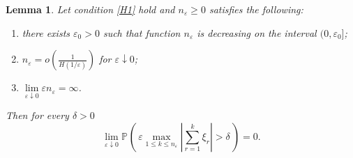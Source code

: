 \documentclass{article}
\makeatletter
\theoremstyle{plain}
\newtheorem{lemma}[theorem]{Lemma}
\theoremstyle{definition}
\theoremstyle{remark}
\newcommand{\p}[2][]{{\mathbb{P}}_{#1} \left( \, #2 \, \right) } %
\def\namedlabel#1#2{\begingroup
    #2%
    \def\@currentlabel{#2}%
    \phantomsection\label{#1}\endgroup
}
\makeatother
\begin{document}
\begin{lemma} \label{l.03} Let condition \ref{H1} hold and 
$n_\varepsilon \geqslant 0$ satisfies the following:
\begin{enumerate}
    \item[\namedlabel{i_l.03}{$(i)$}] there exists $\varepsilon_0>0$ such that function $n_\varepsilon$ is decreasing on the interval $(0,\varepsilon_0]$;
    \item[\namedlabel{ii_l.03}{$(ii)$}] $n_\varepsilon=o\left(\frac{1}{H(1/\varepsilon)}\right)$ for $\varepsilon\downarrow 0$;
    \item[\namedlabel{iii_l.03}{$(iii)$}] $\lim\limits_{\varepsilon\downarrow 0}\varepsilon n_\varepsilon=\infty$.
\end{enumerate}

Then for every $\delta>0$
$$
\lim\limits_{\varepsilon\downarrow 0}\p{\varepsilon\max\limits_{1\leqslant k \leqslant n_\varepsilon}\left|\sum\limits_{r=1}^k\xi_r\right|>\delta}=0.
$$
\end{lemma}
\end{document}
